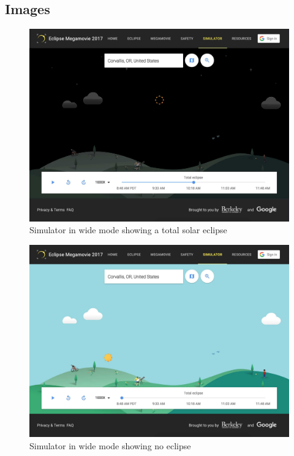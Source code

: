 \documentclass[10pt, onecolumn, draftclsnofoot, letterpaper, compsoc]{IEEEtran}
\begin{document}
\newpage
\subsection{Images}

\begin{figure}[H]
	\begin{center}
  		\includegraphics[width=\textwidth]{sim_total.pdf}
		\caption{Simulator in wide mode showing a total solar eclipse}
	\end{center}
\end{figure}
\newpage

\begin{figure}[!h]
	\begin{center}
			\includegraphics[width=\textwidth]{sim.pdf}
		\caption{Simulator in wide mode showing no eclipse}
	\end{center}
\end{figure}
\newpage
\end{document}
